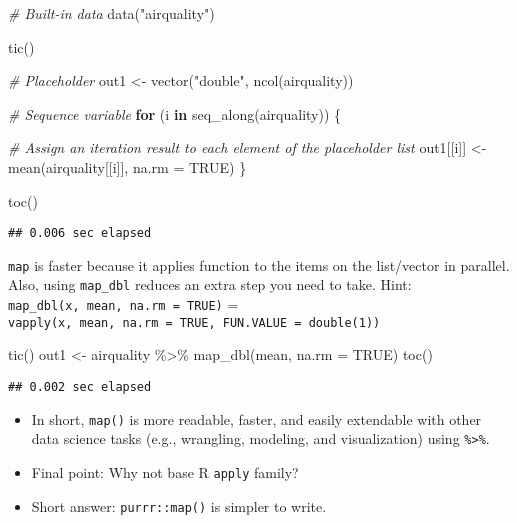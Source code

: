 \documentclass[
]{book}
\newenvironment{Shaded}{\begin{snugshade}}{\end{snugshade}}
\newcommand{\AttributeTok}[1]{\textcolor[rgb]{0.77,0.63,0.00}{#1}}
\newcommand{\CommentTok}[1]{\textcolor[rgb]{0.56,0.35,0.01}{\textit{#1}}}
\newcommand{\ConstantTok}[1]{\textcolor[rgb]{0.00,0.00,0.00}{#1}}
\newcommand{\ControlFlowTok}[1]{\textcolor[rgb]{0.13,0.29,0.53}{\textbf{#1}}}
\newcommand{\FunctionTok}[1]{\textcolor[rgb]{0.00,0.00,0.00}{#1}}
\newcommand{\NormalTok}[1]{#1}
\newcommand{\OtherTok}[1]{\textcolor[rgb]{0.56,0.35,0.01}{#1}}
\newcommand{\SpecialCharTok}[1]{\textcolor[rgb]{0.00,0.00,0.00}{#1}}
\newcommand{\StringTok}[1]{\textcolor[rgb]{0.31,0.60,0.02}{#1}}
\begin{document}
\begin{Shaded}
\begin{Highlighting}[]
\CommentTok{\# Built{-}in data}
\FunctionTok{data}\NormalTok{(}\StringTok{"airquality"}\NormalTok{)}

\FunctionTok{tic}\NormalTok{()}

\CommentTok{\# Placeholder}
\NormalTok{out1 }\OtherTok{\textless{}{-}} \FunctionTok{vector}\NormalTok{(}\StringTok{"double"}\NormalTok{, }\FunctionTok{ncol}\NormalTok{(airquality))}

\CommentTok{\# Sequence variable}
\ControlFlowTok{for}\NormalTok{ (i }\ControlFlowTok{in} \FunctionTok{seq\_along}\NormalTok{(airquality)) \{ }

  \CommentTok{\# Assign an iteration result to each element of the placeholder list }
\NormalTok{  out1[[i]] }\OtherTok{\textless{}{-}} \FunctionTok{mean}\NormalTok{(airquality[[i]], }\AttributeTok{na.rm =} \ConstantTok{TRUE}\NormalTok{)}
\NormalTok{\}}

\FunctionTok{toc}\NormalTok{()}
\end{Highlighting}
\end{Shaded}

\begin{verbatim}
## 0.006 sec elapsed
\end{verbatim}

\texttt{map} is faster because it applies function to the items on the list/vector in parallel. Also, using \texttt{map\_dbl} reduces an extra step you need to take. Hint: \texttt{map\_dbl(x,\ mean,\ na.rm\ =\ TRUE)} = \texttt{vapply(x,\ mean,\ na.rm\ =\ TRUE,\ FUN.VALUE\ =\ double(1))}

\begin{Shaded}
\begin{Highlighting}[]
\FunctionTok{tic}\NormalTok{()}
\NormalTok{out1 }\OtherTok{\textless{}{-}}\NormalTok{ airquality }\SpecialCharTok{\%\textgreater{}\%} \FunctionTok{map\_dbl}\NormalTok{(mean, }\AttributeTok{na.rm =} \ConstantTok{TRUE}\NormalTok{)}
\FunctionTok{toc}\NormalTok{()}
\end{Highlighting}
\end{Shaded}

\begin{verbatim}
## 0.002 sec elapsed
\end{verbatim}

\begin{itemize}
\item
  In short, \texttt{map()} is more readable, faster, and easily extendable with other data science tasks (e.g., wrangling, modeling, and visualization) using \texttt{\%\textgreater{}\%}.
\item
  Final point: Why not base R \texttt{apply} family?
\item
  Short answer: \texttt{purrr::map()} is simpler to write.
\end{itemize}
\end{document}
